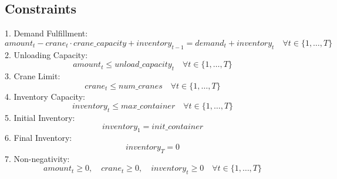 \documentclass{article}
\begin{document}
\subsection*{Constraints}
1. Demand Fulfillment:
\[
amount_{t} - crane_{t} \cdot crane\_capacity + inventory_{t-1} = demand_{t} + inventory_{t} \quad \forall t \in \{1, \dots, T\}
\]
2. Unloading Capacity:
\[
amount_{t} \leq unload\_capacity_{t} \quad \forall t \in \{1, \dots, T\}
\]
3. Crane Limit:
\[
crane_{t} \leq num\_cranes \quad \forall t \in \{1, \dots, T\}
\]
4. Inventory Capacity:
\[
inventory_{t} \leq max\_container \quad \forall t \in \{1, \dots, T\}
\]
5. Initial Inventory:
\[
inventory_{1} = init\_container
\]
6. Final Inventory:
\[
inventory_{T} = 0
\]
7. Non-negativity:
\[
amount_{t} \geq 0, \quad crane_{t} \geq 0, \quad inventory_{t} \geq 0 \quad \forall t \in \{1, \dots, T\}
\]
\end{document}
